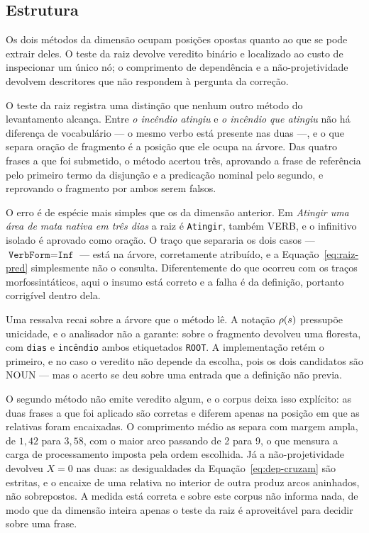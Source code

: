 \subsection{Estrutura}
\label{disc:estrutura}

\indent\indent Os dois métodos da dimensão ocupam posições opostas quanto ao que se pode extrair deles. O
teste da raiz devolve veredito binário e localizado ao custo de inspecionar um único nó; o
comprimento de dependência e a não-projetividade devolvem descritores que não respondem à
pergunta da correção.

O teste da raiz registra uma distinção que nenhum outro método do levantamento alcança. Entre
\emph{o incêndio atingiu} e \emph{o incêndio que atingiu} não há diferença de vocabulário ---
o mesmo verbo está presente nas duas ---, e o que separa oração de fragmento é a posição que
ele ocupa na árvore. Das quatro frases a que foi submetido, o método acertou três, aprovando a
frase de referência pelo primeiro termo da disjunção e a predicação nominal pelo segundo, e
reprovando o fragmento por ambos serem falsos.

O erro é de espécie mais simples que os da dimensão anterior. Em \emph{Atingir uma área de
mata nativa em três dias} a raiz é \texttt{Atingir}, também VERB, e o infinitivo isolado é
aprovado como oração. O traço que separaria os dois casos ---
$\texttt{VerbForm} = \texttt{Inf}$ --- está na árvore, corretamente atribuído, e a
Equação~\ref{eq:raiz-pred} simplesmente não o consulta. Diferentemente do que ocorreu com os
traços morfossintáticos, aqui o insumo está correto e a falha é da definição, portanto
corrigível dentro dela.

Uma ressalva recai sobre a árvore que o método lê. A notação $\rho(s)$ pressupõe
unicidade, e o analisador não a garante: sobre o fragmento devolveu uma floresta, com
\texttt{dias} e \texttt{incêndio} ambos etiquetados \texttt{ROOT}. A implementação retém o
primeiro, e no caso o veredito não depende da escolha, pois os dois candidatos são NOUN --- mas
o acerto se deu sobre uma entrada que a definição não previa.

O segundo método não emite veredito algum, e o corpus deixa isso explícito: as duas frases a
que foi aplicado são corretas e diferem apenas na posição em que as relativas foram
encaixadas. O comprimento médio as separa com margem ampla, de $1{,}42$ para $3{,}58$, com o
maior arco passando de 2 para 9, o que mensura a carga de processamento imposta pela ordem
escolhida. Já a não-projetividade devolveu $X = 0$ nas duas: as desigualdades da
Equação~\ref{eq:dep-cruzam} são estritas, e o encaixe de uma relativa no interior de outra
produz arcos aninhados, não sobrepostos. A medida está correta e sobre este corpus não informa
nada, de modo que da dimensão inteira apenas o teste da raiz é aproveitável para decidir sobre
uma frase.



